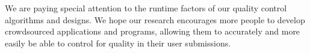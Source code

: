 \documentclass{sig-alternate-05-2015}
\begin{document}
	We are paying special attention to the runtime factors of our quality control algorithms and designs. We hope our research encourages more people to develop crowdsourced applications and programs, allowing them to accurately and more easily be able to control for quality in their user submissions.
	
	
\end{document}
